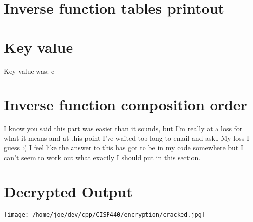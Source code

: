 \documentclass[12pt,titlepage]{article}
\begin{document}
\section{Inverse function tables printout}

\section{Key value}
Key value was: c
\section{Inverse function composition order}
I know you said this part was easier than it sounds, but I'm really at a loss for what
it means and at this point I've waited too long to email and ask.. My loss I guess :(
I feel like the answer to this has got to be in my code somewhere but I can't seem
to work out what exactly I should put in this section.
\section{Decrypted Output}
\texttt{[image: /home/joe/dev/cpp/CISP440/encryption/cracked.jpg]}
\end{document}
